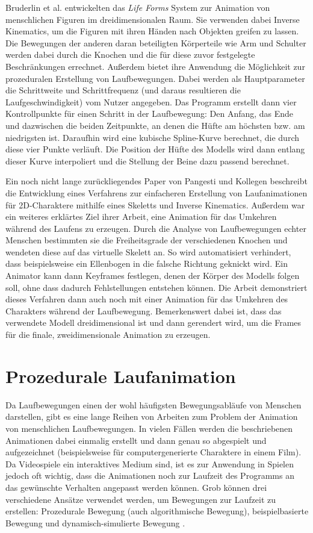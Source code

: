 Bruderlin et al. \cite{bruderlin1994procedural} entwickelten das \textit{Life Forms} System zur Animation von menschlichen Figuren im dreidimensionalen Raum. Sie verwenden dabei Inverse Kinematics, um die Figuren mit ihren Händen nach Objekten greifen zu lassen. Die Bewegungen der anderen daran beteiligten Körperteile wie Arm und Schulter werden dabei durch die Knochen und die für diese zuvor festgelegte Beschränkungen errechnet. Außerdem bietet ihre Anwendung die Möglichkeit zur prozeduralen Erstellung von Laufbewegungen. Dabei werden als Hauptparameter die Schrittweite und Schrittfrequenz (und daraus resultieren die Laufgeschwindigkeit) vom Nutzer angegeben. Das Programm erstellt dann vier Kontrollpunkte für einen Schritt in der Laufbewegung: Den Anfang, das Ende und dazwischen die beiden Zeitpunkte, an denen die Hüfte am höchsten bzw. am niedrigsten ist. Daraufhin wird eine kubische Spline-Kurve berechnet, die durch diese vier Punkte verläuft. Die Position der Hüfte des Modells wird dann entlang dieser Kurve interpoliert und die Stellung der Beine dazu passend berechnet.

Ein noch nicht lange zurückliegendes Paper von Pangesti und Kollegen \cite{pangesti2019analysis} beschreibt die Entwicklung eines Verfahrens zur einfacheren Erstellung von Laufanimationen für 2D-Charaktere mithilfe eines Skeletts und Inverse Kinematics. Außerdem war ein weiteres erklärtes Ziel ihrer Arbeit, eine Animation für das Umkehren während des Laufens zu erzeugen. Durch die Analyse von Laufbewegungen echter Menschen bestimmten sie die Freiheitsgrade der verschiedenen Knochen und wendeten diese auf das virtuelle Skelett an. So wird automatisiert verhindert, dass beispielsweise ein Ellenbogen in die falsche Richtung geknickt wird. Ein Animator kann dann Keyframes festlegen, denen der Körper des Modells folgen soll, ohne dass dadurch Fehlstellungen entstehen können. Die Arbeit demonstriert dieses Verfahren dann auch noch mit einer Animation für das Umkehren des Charakters während der Laufbewegung. Bemerkenswert dabei ist, dass das verwendete Modell dreidimensional ist und dann gerendert wird, um die Frames für die finale, zweidimensionale Animation zu erzeugen.

\section{Prozedurale Laufanimation}
Da Laufbewegungen einen der wohl häufigsten Bewegungsabläufe von Menschen darstellen, gibt es eine lange Reihen von Arbeiten zum Problem der Animation von menschlichen Laufbewegungen. In vielen Fällen werden die beschriebenen Animationen dabei einmalig erstellt und dann genau so abgespielt und aufgezeichnet (beispielsweise für computergenerierte Charaktere in einem Film). Da Videospiele ein interaktives Medium sind, ist es zur Anwendung in Spielen jedoch oft wichtig, dass die Animationen noch zur Laufzeit des Programms an das gewünschte Verhalten angepasst werden können. Grob können drei verschiedene Ansätze verwendet werden, um Bewegungen zur Laufzeit zu erstellen: Prozedurale Bewegung (auch algorithmische Bewegung), beispielbasierte Bewegung und dynamisch-simulierte Bewegung \cite{johansen2009automated}.

